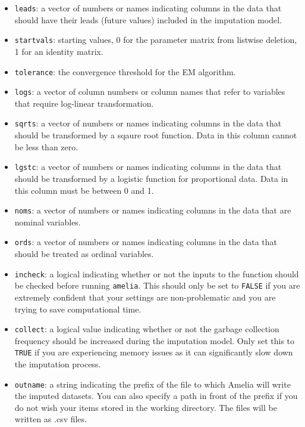 \documentclass[12pt,titlepage]{article}
\begin{document}
\begin{itemize}
  \item \texttt{leads}:  a vector of numbers or names indicating columns in the data that should have their leads (future values) included in the imputation model.

  \item \texttt{startvals}:  starting values, 0 for the parameter matrix from
    listwise deletion, 1 for an identity matrix.

  \item \texttt{tolerance}:  the convergence threshold for the EM algorithm.

  \item \texttt{logs}: a vector of column numbers or column names that refer 
    to variables that require log-linear transformation.
    
  \item  \texttt{sqrts}: a vector of numbers or names indicating columns in the data that should be transformed by a sqaure root function.  Data in this column cannot be less than zero.
  
  \item \texttt{lgstc}: a vector of numbers or names indicating columns in the data that should be transformed by a logistic function for proportional data.
    Data in this column must be between 0 and 1.
      
  \item \texttt{noms}: a vector of numbers or names indicating columns in the data that are nominal variables.

  \item \texttt{ords}: a vector of numbers or names indicating columns in the
    data that should be treated as ordinal variables.

  \item \texttt{incheck}:  a logical indicating whether or not the inputs to the
    function should be checked before running \texttt{amelia}.  This should
    only be set to \texttt{FALSE} if you are extremely confident that your
    settings are non-problematic and you are trying to save computational 
    time.

  \item \texttt{collect}:  a logical value indicating whether or
        not the garbage collection frequency should be increased during the imputation model.  Only set this to \texttt{TRUE} if you are experiencing memory
        issues as it can significantly slow down the imputation process.

  \item \texttt{outname}:  a string indicating the prefix of the file to which
    Amelia will write the imputed datasets.  You can also specify a path
    in front of the prefix if you do not wish your items stored in the
    working directory.  The files will be written as .csv files.


\end{itemize}
\end{document}
